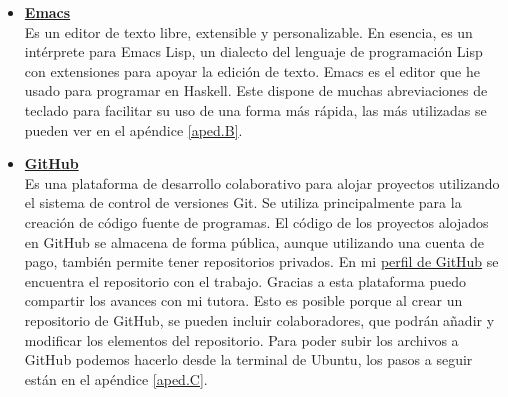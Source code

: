 \begin{itemize}
\item \href{https://www.gnu.org/software/emacs/}{\textbf{Emacs}}\\
Es un editor de texto libre, extensible y personalizable. En esencia, es un intérprete para Emacs Lisp, un dialecto del lenguaje de programación Lisp con extensiones para apoyar la edición de texto. Emacs es el editor que he usado para programar en Haskell. Este dispone de muchas abreviaciones de teclado para facilitar su uso de una forma más rápida, las más utilizadas se pueden ver en el apéndice \ref{aped.B}.

\item \href{https://github.com/}{\textbf{GitHub}}\\
Es una plataforma de desarrollo colaborativo para alojar proyectos utilizando el sistema de control de versiones Git. Se utiliza principalmente para la creación de código fuente de programas. El código de los proyectos alojados en GitHub se almacena de forma pública, aunque utilizando una cuenta de pago, también permite tener repositorios privados. En mi \href{https://github.com/AngelaGM10}{perfil de GitHub} se encuentra el repositorio con el trabajo. Gracias a esta plataforma puedo compartir los avances con mi tutora. Esto es posible porque al crear un repositorio de GitHub, se pueden incluir colaboradores, que podrán añadir y modificar los elementos del repositorio. Para poder subir los archivos a GitHub podemos hacerlo desde la terminal de Ubuntu, los pasos a seguir están en el apéndice \ref{aped.C}.

\end{itemize}